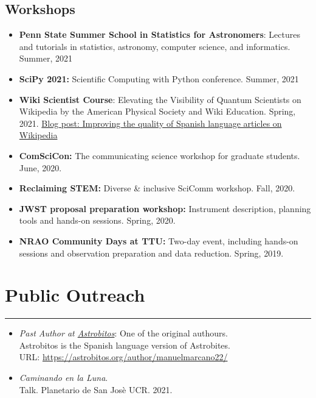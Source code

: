 \documentclass[letterpaper,10pt]{article}
\begin{document}
\subsection*{Workshops}
\begin{itemize}[label=$\blacktriangleright$]

\item \textbf{Penn State Summer School in Statistics for Astronomers}: Lectures and tutorials in statistics, astronomy, computer science, and informatics. Summer, 2021

\item \textbf{SciPy 2021:} Scientific Computing with Python conference. Summer, 2021
    \item  \textbf{Wiki Scientist Course}: Elevating the Visibility of Quantum Scientists on Wikipedia by the American Physical Society and Wiki Education. Spring, 2021. \href{https://wikiedu.org/blog/2021/05/24/improving-the-quality-of-spanish-language-articles-on-wikipedia/}{Blog post: Improving the quality of Spanish language articles on Wikipedia}
    \item \textbf{ComSciCon:} The communicating science workshop for graduate students. June, 2020.
    \item \textbf{Reclaiming STEM:} Diverse \& inclusive SciComm workshop. Fall, 2020.
    
            \item \textbf{JWST proposal preparation workshop:}  Instrument description, planning tools and hands-on sessions. Spring, 2020.

    
    
    
        \item \textbf{NRAO Community Days at TTU:}  Two-day event, including  hands-on sessions and observation preparation and data reduction. Spring, 2019.


\end{itemize}


\section*{Public Outreach}
\hrule
\vspace{.3 cm}
\begin{itemize}[label=$\blacktriangleright$]

\item \emph{Past Author at \href{https://astrobitos.org/}{Astrobitos}}: One of the original authours. \\ Astrobitos is the Spanish language version of Astrobites.\\ URL: \url{https://astrobitos.org/author/manuelmarcano22/}

\item \textit{Caminando en la Luna}. \\
Talk. Planetario de San Jos\`e UCR. 2021.
\end{itemize}
\end{document}
